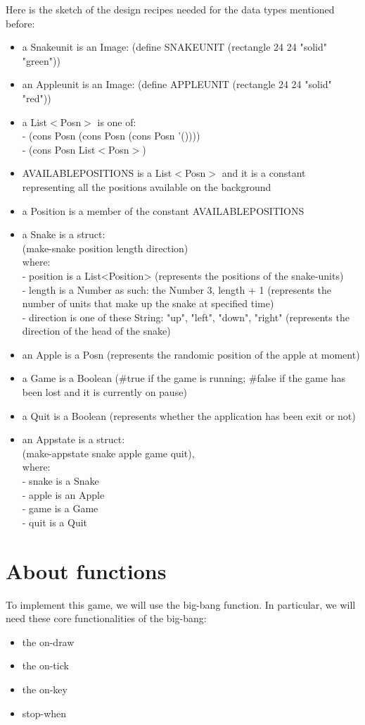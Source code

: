 \documentclass{article}
\begin{document}
	Here is the sketch of the design recipes needed for the data types mentioned before:
	\begin{itemize}
		\item a Snakeunit is an Image: (define SNAKEUNIT (rectangle 24 24 "solid" "green"))
		\item an Appleunit is an Image: (define APPLEUNIT (rectangle 24 24 "solid" "red"))
		\item a List$<$Posn$>$ is one of:\\
				- (cons Posn (cons Posn (cons Posn '())))\\
				- (cons Posn List$<$Posn$>$)
		\item AVAILABLEPOSITIONS is a List$<$Posn$>$ and it is a constant representing all the positions available on the background
		\item a Position is a member of the constant AVAILABLEPOSITIONS 
		\item a Snake is a struct:\\
				(make-snake position length direction)\\
				where:\\ 
				- position is a List<Position> (represents the positions of the snake-units)\\
				- length is a Number as such: the Number 3, length + 1 (represents the number of units that make up the snake at specified time)\\
				- direction is one of these String: "up", "left", "down", "right"  (represents the direction of the head of the snake)
		\item an Apple is a Posn (represents the randomic position of the apple at moment)
		\item a Game is a Boolean (\#true if the game is running; \#false if the game has been lost and it is currently on pause)
		\item a Quit is a Boolean (represents whether the application has been exit or not)
		\item an Appstate is a struct:\\
				(make-appstate snake apple game quit),\\
				where:\\
				- snake is a Snake\\
				- apple is an Apple\\
				- game is a Game\\
				- quit is a Quit
	\end{itemize}
	
	\section{About functions}
	To implement this game, we will use the big-bang function. In particular, we will need these core functionalities of the big-bang: 
	\begin{itemize}
		\item the on-draw
		\item the on-tick
		\item the on-key
		\item stop-when
	\end{itemize}
	
\end{document}
